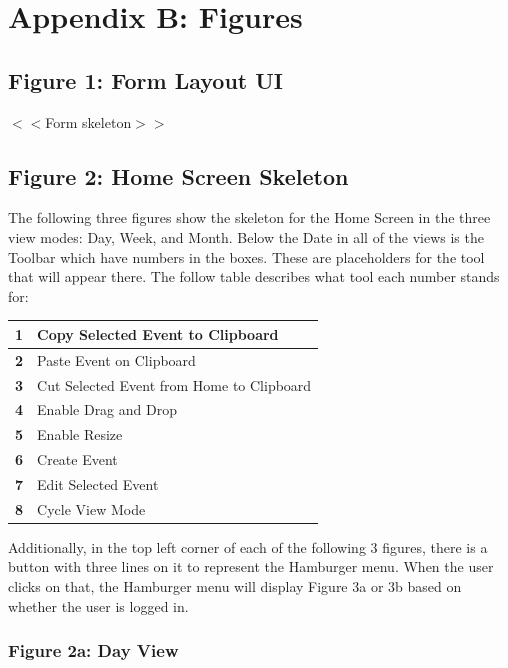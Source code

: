 \documentclass{scrreprt}
\begin{document}
\chapter{Appendix B: Figures}

\section{Figure 1: Form Layout UI}

$<$$<$Form skeleton$>$$>$

\section{Figure 2: Home Screen Skeleton}

The following three figures show the skeleton for the Home Screen in the three view modes: Day, Week, and Month.  Below the Date in all of the views is the Toolbar which have numbers in the boxes.  These are placeholders for the tool that will appear there.  The follow table describes what tool each number stands for:\\

\begin{center}
\begin{longtable}{ | p{0.3cm} | p{7.5cm} | }
\hline
\textbf{1} & Copy Selected Event to Clipboard \\
\hline
\textbf{2} & Paste Event on Clipboard \\
\hline
\textbf{3} & Cut Selected Event from Home to Clipboard \\
\hline
\textbf{4} & Enable Drag and Drop \\
\hline
\textbf{5} & Enable Resize \\
\hline
\textbf{6} & Create Event \\
\hline
\textbf{7} & Edit Selected Event \\
\hline
\textbf{8} & Cycle View Mode \\
\hline
\end{longtable}
\end{center}

Additionally, in the top left corner of each of the following 3 figures, there is a button with three lines on it to represent the Hamburger menu.  When the user clicks on that, the Hamburger menu will display Figure 3a or 3b based on whether the user is logged in.

\subsection{Figure 2a: Day View}
\end{document}
